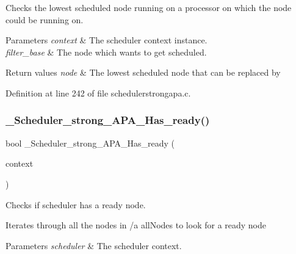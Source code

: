 Checks the lowest scheduled node running on a processor on which the  node could be running on. 


\begin{DoxyParams}{Parameters}
{\em context} & The scheduler context instance. \\
\hline
{\em filter\+\_\+base} & The node which wants to get scheduled.\\
\hline
\end{DoxyParams}

\begin{DoxyRetVals}{Return values}
{\em node} & The lowest scheduled node that can be replaced by  \\
\hline
\end{DoxyRetVals}


Definition at line 242 of file schedulerstrongapa.\+c.

\mbox{\label{group__RTEMSScoreSchedulerStrongAPA_ga1eb39ec8e5e7663e5696db912ddf01ba}} 
\subsubsection{\texorpdfstring{\+\_\+\+Scheduler\+\_\+strong\+\_\+\+A\+P\+A\+\_\+\+Has\+\_\+ready()}{\_Scheduler\_strong\_APA\_Has\_ready()}}
{\footnotesize\ttfamily bool \+\_\+\+Scheduler\+\_\+strong\+\_\+\+A\+P\+A\+\_\+\+Has\+\_\+ready (\begin{DoxyParamCaption}\item[{Scheduler\+\_\+\+Context $\ast$}]{context }\end{DoxyParamCaption})}



Checks if scheduler has a ready node. 

Iterates through all the nodes in /a all\+Nodes to look for a ready node


\begin{DoxyParams}{Parameters}
{\em scheduler} & The scheduler context. \\
\hline
\end{DoxyParams}

